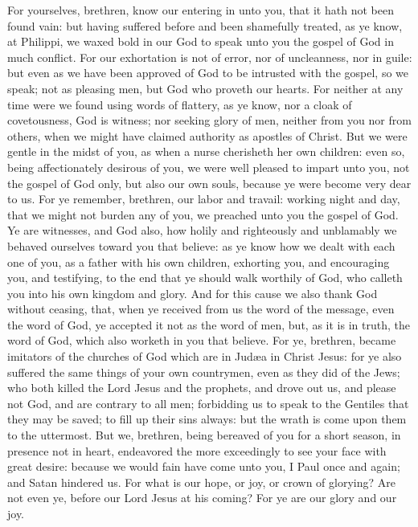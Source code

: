 For yourselves, brethren, know our entering in unto you, that it hath not been found vain: but having suffered before and been shamefully treated, as ye know, at Philippi, we waxed bold in our God to speak unto you the gospel of God in much conflict. For our exhortation is not of error, nor of uncleanness, nor in guile: but even as we have been approved of God to be intrusted with the gospel, so we speak; not as pleasing men, but God who proveth our hearts. For neither at any time were we found using words of flattery, as ye know, nor a cloak of covetousness, God is witness; nor seeking glory of men, neither from you nor from others, when we might have claimed authority as apostles of Christ. But we were gentle in the midst of you, as when a nurse cherisheth her own children: even so, being affectionately desirous of you, we were well pleased to impart unto you, not the gospel of God only, but also our own souls, because ye were become very dear to us. For ye remember, brethren, our labor and travail: working night and day, that we might not burden any of you, we preached unto you the gospel of God. Ye are witnesses, and God also, how holily and righteously and unblamably we behaved ourselves toward you that believe: as ye know how we dealt with each one of you, as a father with his own children, exhorting you, and encouraging you, and testifying, to the end that ye should walk worthily of God, who calleth you into his own kingdom and glory.  And for this cause we also thank God without ceasing, that, when ye received from us the word of the message, even the word of God, ye accepted it not as the word of men, but, as it is in truth, the word of God, which also worketh in you that believe. For ye, brethren, became imitators of the churches of God which are in Judæa in Christ Jesus: for ye also suffered the same things of your own countrymen, even as they did of the Jews; who both killed the Lord Jesus and the prophets, and drove out us, and please not God, and are contrary to all men; forbidding us to speak to the Gentiles that they may be saved; to fill up their sins always: but the wrath is come upon them to the uttermost.  But we, brethren, being bereaved of you for a short season, in presence not in heart, endeavored the more exceedingly to see your face with great desire: because we would fain have come unto you, I Paul once and again; and Satan hindered us. For what is our hope, or joy, or crown of glorying? Are not even ye, before our Lord Jesus at his coming? For ye are our glory and our joy. 

